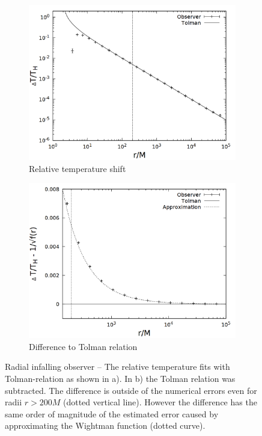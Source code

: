 \begin{figure}[h]
  \centering
  \begin{subfigure}[h]{0.5\textwidth}
    \centering
    \includegraphics[width=\textwidth]{cpp/final/rad.png}
    \caption{Relative temperature shift}
  \end{subfigure}%
  \begin{subfigure}[h]{0.5\textwidth}
    \centering
    \includegraphics[width=\textwidth]{cpp/final/rad_tolman_error.png}
    \caption{Difference to Tolman relation}
  \end{subfigure}
  \caption[Radial infalling observer]{Radial infalling observer -- The relative temperature fits with Tolman-relation as shown in a). In b) the Tolman relation was subtracted. The difference is outside of the numerical errors even for radii \(r > 200 M\) (dotted vertical line). However the difference has the same order of magnitude of the estimated error caused by approximating the Wightman function (dotted curve).}
  \label{fig:bh_rad}
\end{figure}

